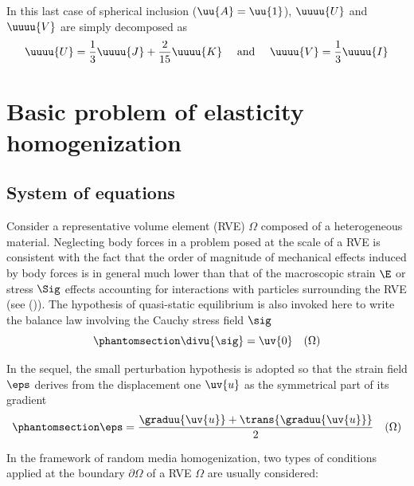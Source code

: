 \documentclass[
  letterpaper,
  DIV=11,
  numbers=noendperiod]{scrreprt}
\begin{document}
In this last case of spherical inclusion (\(\uu{A}=\uu{1}\)),
\(\uuuu{U}\) and \(\uuuu{V}\) are simply decomposed as \[
\uuuu{U}=\frac{1}{3}\uuuu{J}+\frac{2}{15}\uuuu{K}
\quad\textrm{ and }\quad
\uuuu{V}=\frac{1}{3}\uuuu{I}
\]

\chapter{Basic problem of elasticity
homogenization}\label{sec-basics_elas}

\section{System of equations}\label{sec-basics_elas_sys_eq}

Consider a representative volume element (RVE) \(\Omega\) composed of a
heterogeneous material. Neglecting body forces in a problem posed at the
scale of a RVE is consistent with the fact that the order of magnitude
of mechanical effects induced by body forces is in general much lower
than that of the macroscopic strain \(\E\) or stress \(\Sig\) effects
accounting for interactions with particles surrounding the RVE (see
()). The hypothesis of
quasi-static equilibrium is also invoked here to write the balance law
involving the Cauchy stress field \(\sig\)
\begin{equation}\phantomsection\label{eq-divsigma}{
\divu{\sig}=\uv{0} \quad(\Omega)
}\end{equation}

In the sequel, the small perturbation hypothesis is adopted so that the
strain field \(\eps\) derives from the displacement one \(\uv{u}\) as
the symmetrical part of its gradient
\begin{equation}\phantomsection\label{eq-epsgradu}{
\eps=\frac{\graduu{\uv{u}}+\trans{\graduu{\uv{u}}}}{2} \quad(\Omega)
}\end{equation}

In the framework of random media homogenization, two types of conditions
applied at the boundary \(\partial\Omega\) of a RVE \(\Omega\) are
usually considered:
\end{document}
